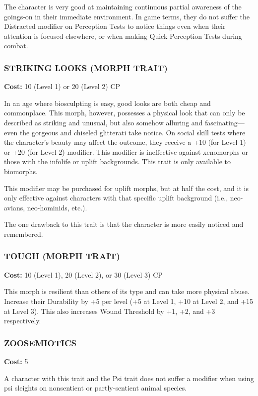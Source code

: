 The character is very good at maintaining continuous partial awareness of the
goings-on in their immediate environment. In game terms, they do not suffer the
Distracted modifier on Perception Tests to notice things even when their
attention is focused elsewhere, or when making Quick Perception Tests during
combat.

\subsubsection{STRIKING LOOKS (MORPH TRAIT)}
\textbf{Cost:} 10 (Level 1) or 20 (Level 2) CP

In an age where biosculpting is easy, good looks are both cheap and
commonplace. This morph, however, possesses a physical look that can only be
described as striking and unusual, but also somehow alluring and
fascinating—even the gorgeous and chiseled glitterati take notice. On social
skill tests where the character’s beauty may affect the outcome, they receive a
+10 (for Level 1) or +20 (for Level 2) modifier. This modifier is ineffective
against xenomorphs or those with the infolife or uplift backgrounds. This trait
is only available to biomorphs.

This modifier may be purchased for uplift morphs, but at half the cost, and it
is only effective against characters with that specific uplift background
(i.e., neo-avians, neo-hominids, etc.).

The one drawback to this trait is that the character is more easily noticed and
remembered.

\subsubsection{TOUGH (MORPH TRAIT)}
\textbf{Cost:} 10 (Level 1), 20 (Level 2), or 30 (Level 3) CP

This morph is resilient than others of its type and can take more physical
abuse. Increase their Durability by +5 per level (+5 at Level 1, +10 at Level
2, and +15 at Level 3). This also increases Wound Threshold by +1, +2, and +3
respectively.

\subsubsection{ZOOSEMIOTICS}
\textbf{Cost:} 5

A character with this trait and the Psi trait does not suffer a modifier when
using psi sleights on nonsentient or partly-sentient animal species.

